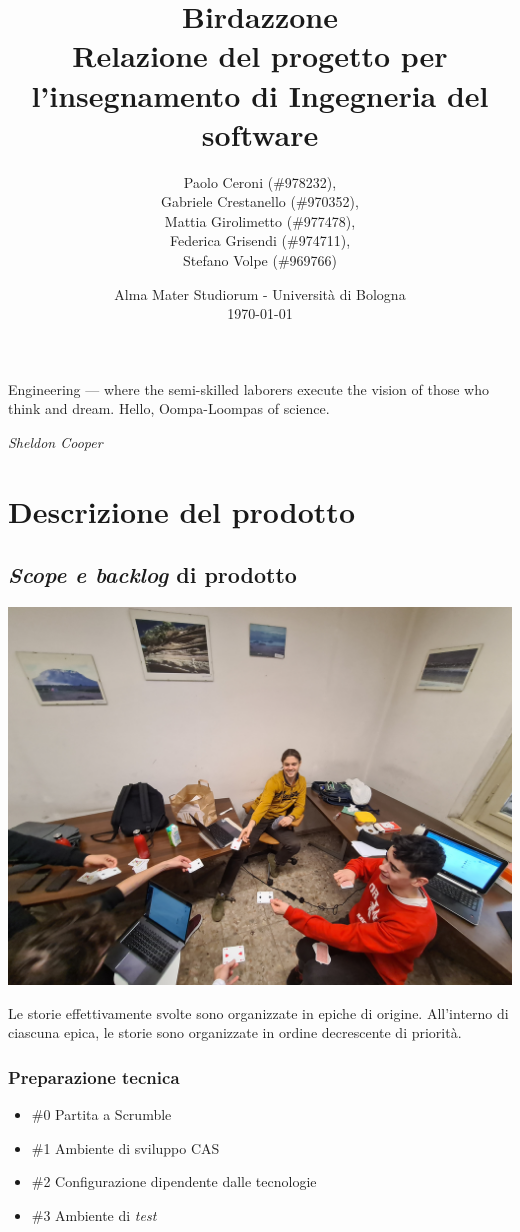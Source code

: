 \documentclass{article}
\title{
	\textbf{
		Birdazzone \\
	}
	\textbf{\large
		Relazione del progetto per l'insegnamento di \break
		Ingegneria del software
	}
}
\author{
	Paolo Ceroni (\#978232), \\
	Gabriele Crestanello (\#970352), \\
	Mattia Girolimetto (\#977478), \\
	Federica Grisendi (\#974711), \\
	Stefano Volpe (\#969766)
}
\date{
	Alma Mater Studiorum - Universit\`a di Bologna \\
	\today
}
\begin{document}
\maketitle

\epigraph{
	Engineering --- where the semi-skilled laborers execute the vision of those
	who think and dream. Hello, Oompa-Loompas of science.
}{\textit{Sheldon Cooper}}

\thispagestyle{empty}
\pagebreak

\tableofcontents

\pagebreak

\section{Descrizione del prodotto}

\subsection{\emph{Scope e backlog} di prodotto}

\includegraphics[width=\textwidth]{planning-poker}

Le storie effettivamente svolte sono organizzate in epiche di origine.
All'interno di ciascuna epica, le storie sono organizzate in ordine decrescente
di priorità.

\subsubsection{Preparazione tecnica}

\begin{itemize}
	\item \#0 Partita a Scrumble
	\item \#1 Ambiente di sviluppo CAS
	\item \#2 Configurazione dipendente dalle tecnologie
	\item \#3 Ambiente di \emph{test}
\end{itemize}
\end{document}
